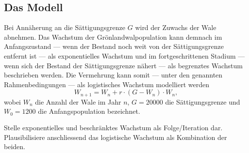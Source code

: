 \documentclass[%
11pt,%
twoside,%
titlepage,%
german,%
headsepline%
]{scrartcl}
\begin{document}
\subsection{Das Modell}
Bei Annäherung an die Sättigungsgrenze $G$ wird der Zuwachs der Wale abnehmen. Das Wachstum der Grönlandwalpopulation kann demnach im Anfangszustand --- wenn der Bestand noch weit von der Sättigungsgrenze entfernt ist --- als exponentielles Wachstum und im fortgeschrittenen Stadium --- wenn sich der Bestand der Sättigungsgrenze nähert --- als begrenztes Wachstum beschrieben werden. Die Vermehrung kann somit --- unter den genannten Rahmenbedingungen --- als logistisches Wachstum modelliert werden
$$W_{n+1}=W_n+r\cdot (G-W_n)\cdot W_n,$$
wobei $W_n$ die Anzahl der Wale im Jahr $n$, $G=20000$ die Sättigungsgrenze und $W_0=1200$ die Anfangspopulation bezeichnet.

\begin{ueb}
Stelle exponentielles und beschränktes Wachstum als Folge/Iteration dar. Plausibilisiere anschliessend das logistische Wachstum als Kombination der beiden.
\end{ueb}
\end{document}
